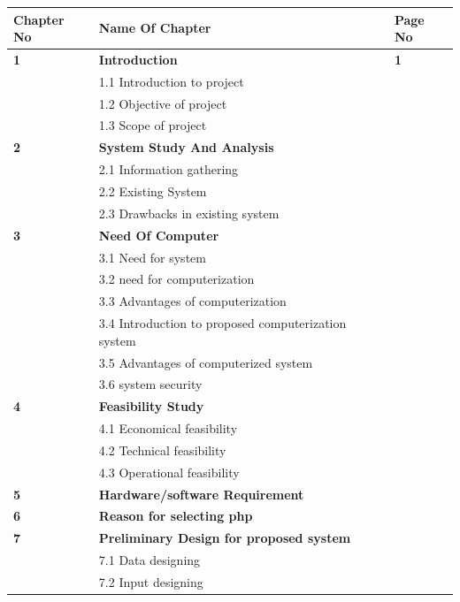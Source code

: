 \documentclass{article} %
\begin{document}
\begin{tabular}{|p{0.8in}|p{3.0in}|p{0.8in}|} \hline 
\textbf{Chapter No} & \textbf{Name Of Chapter} & \textbf{Page No} \\ \hline 
\textbf{1} & \textbf{Introduction} & \textbf{1} \\ \hline 
\textbf{} & 1.1 Introduction to project &  \\ \hline 
\textbf{} & 1.2 Objective of project &  \\ \hline 
\textbf{} & 1.3 Scope of project &  \\ \hline 
\textbf{2} & \textbf{System Study And Analysis} & \textbf{} \\ \hline 
\textbf{} & 2.1 Information gathering & \textbf{} \\ \hline 
\textbf{} & 2.2 Existing System & \textbf{} \\ \hline 
\textbf{} & 2.3 Drawbacks in existing system & \textbf{} \\ \hline 
\textbf{3} & \textbf{Need Of Computer} & \textbf{} \\ \hline 
\textbf{} & 3.1 Need for system & \textbf{} \\ \hline 
\textbf{} & 3.2 need for computerization & \textbf{} \\ \hline 
\textbf{} & 3.3 Advantages of computerization & \textbf{} \\ \hline 
\textbf{} & 3.4 Introduction to proposed computerization system  & \textbf{} \\ \hline 
\textbf{} & 3.5 Advantages of computerized system & \textbf{} \\ \hline 
\textbf{} & 3.6 system security & \textbf{} \\ \hline 
\textbf{4} & \textbf{Feasibility Study} & \textbf{} \\ \hline 
\textbf{} & 4.1 Economical feasibility & \textbf{} \\ \hline 
\textbf{} & 4.2 Technical feasibility & \textbf{} \\ \hline 
\textbf{} & 4.3 Operational feasibility & \textbf{} \\ \hline 
\textbf{5} & \textbf{Hardware/software Requirement} & \textbf{} \\ \hline 
\textbf{6} & \textbf{Reason for selecting php} & \textbf{} \\ \hline 
\textbf{7} & \textbf{Preliminary Design for proposed system} & \textbf{} \\ \hline 
\textbf{} & 7.1 Data designing & \textbf{} \\ \hline 
\textbf{} & 7.2 Input designing & \textbf{} \\ \hline 

\end{tabular}
\end{document}
